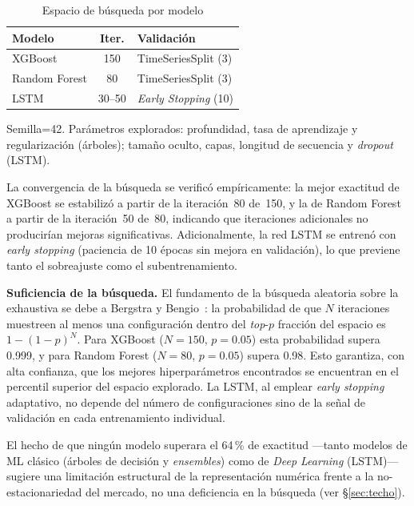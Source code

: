\documentclass[10pt,twocolumn]{article}
\begin{document}
\begin{table}[ht]
\centering
\caption{Espacio de b\'usqueda por modelo}
\label{tab:gridsearch}
\footnotesize
\begin{tabularx}{\columnwidth}{lcX}
\toprule
\textbf{Modelo} & \textbf{Iter.} & \textbf{Validaci\'on} \\
\midrule
XGBoost & 150 & TimeSeriesSplit (3) \\
Random Forest & 80 & TimeSeriesSplit (3) \\
LSTM & 30--50 & \textit{Early Stopping} (10) \\
\bottomrule
\end{tabularx}
{\scriptsize Semilla=42. Par\'ametros explorados: profundidad, tasa de aprendizaje y regularizaci\'on (\'arboles); tama\~no oculto, capas, longitud de secuencia y \textit{dropout} (LSTM).}
\end{table}

La convergencia de la b\'usqueda se verific\'o emp\'iricamente: la mejor exactitud de XGBoost se estabiliz\'o a partir de la iteraci\'on~80 de~150, y la de Random Forest a partir de la iteraci\'on~50 de~80, indicando que iteraciones adicionales no producir\'ian mejoras significativas. Adicionalmente, la red LSTM se entren\'o con \textit{early stopping} (paciencia de 10 \'epocas sin mejora en validaci\'on), lo que previene tanto el sobreajuste como el subentrenamiento.

\textbf{Suficiencia de la b\'usqueda.} El fundamento de la b\'usqueda aleatoria sobre la exhaustiva se debe a Bergstra y Bengio~\cite{bergstra2012}: la probabilidad de que $N$ iteraciones muestreen al menos una configuraci\'on dentro del \textit{top}-$p$ fracci\'on del espacio es $1-(1-p)^N$. Para XGBoost ($N=150$, $p=0.05$) esta probabilidad supera 0.999, y para Random Forest ($N=80$, $p=0.05$) supera 0.98. Esto garantiza, con alta confianza, que los mejores hiperpar\'ametros encontrados se encuentran en el percentil superior del espacio explorado. La LSTM, al emplear \textit{early stopping} adaptativo, no depende del n\'umero de configuraciones sino de la se\~nal de validaci\'on en cada entrenamiento individual.

El hecho de que ning\'un modelo superara el 64\,\% de exactitud ---tanto modelos de ML cl\'asico (\'arboles de decisi\'on y \textit{ensembles}) como de \textit{Deep Learning} (LSTM)--- sugiere una limitaci\'on estructural de la representaci\'on num\'erica frente a la no-estacionariedad del mercado, no una deficiencia en la b\'usqueda (ver \S\ref{sec:techo}).
\end{document}
